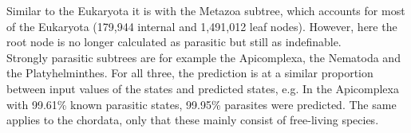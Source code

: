       Similar to the Eukaryota it is with the Metazoa subtree, which accounts for most of the Eukaryota 
        (179,944 internal and 1,491,012 leaf nodes). However, here the root node is no longer calculated 
        as parasitic but still as indefinable. \\
      Strongly parasitic subtrees are for example the Apicomplexa, the Nematoda and the Platyhelminthes. 
        For all three, the prediction is at a similar proportion between input values of the states and 
        predicted states, e.g. In the Apicomplexa with 99.61\% known parasitic states, 99.95\% parasites 
        were predicted. The same applies to the chordata, only that these mainly consist of free-living 
        species.
      
